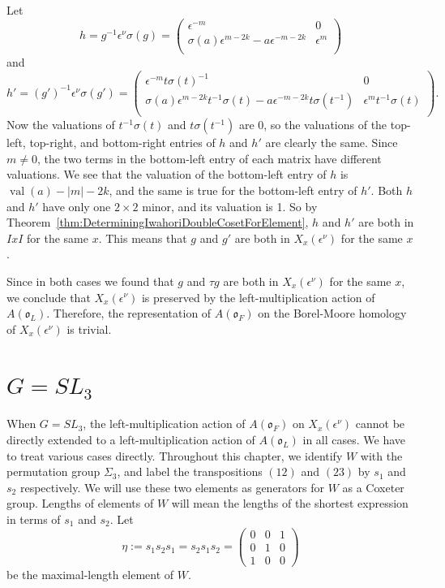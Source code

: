 \documentclass{amsart}
\theoremstyle{definition}
\def\O{\mathfrak{o}}
\def\e{\epsilon}
\def\val{\mathop{\mathrm{val}}}
\def\s{\sigma}
\def\A{A(\O_F)}
\def\en{\e^{\nu}}
\def\X{X_x(\en)}
\newenvironment{caselist}
	       {\begin{list}{\underline{Case \arabic{enumi}}:}
		   {\usecounter{enumi}
		     \setlength{\itemindent}{0.5in}
		     \setlength{\leftmargin}{0in}
		     \setlength{\rightmargin}{0in}
	       }}
	       {\end{list}}
\begin{document}
\begin{caselist}
      Let
      \begin{equation*}
	h = g^{-1}\en \s(g) =
	\begin{pmatrix}
	  \e^{-m} & 0 \\
	  \s(a)\e^{m-2k} - a \e^{-m-2k} & \e^{m} \\
      	\end{pmatrix}
      \end{equation*}
      and 
      \begin{equation*}
	h' = (g')^{-1}\en \s(g') = 
	\begin{pmatrix}
	  \e^{-m} t\s(t)^{-1} & 0 \\
	  \s(a)\e^{m-2k}t^{-1}\s(t) - a \e^{-m-2k} t\s(t^{-1}) & \e^{m}t^{-1}\s(t)\\
	\end{pmatrix}.
      \end{equation*}
      Now the valuations of $t^{-1}\s(t)$ and $t\s(t^{-1})$ are 0, so the
      valuations of the top-left, top-right, and bottom-right entries of $h$
      and $h'$ are clearly the same.  Since $m \neq 0$, the two terms in the
      bottom-left entry of each matrix have different valuations.  We see that
      the valuation of the bottom-left entry of $h$ is $\val(a) - |m| - 2k$,
      and the same is true for the bottom-left entry of $h'$.  Both $h$ and
      $h'$ have only one $2 \times 2$ minor, and its valuation is 1.  So by
      Theorem~\ref{thm:DeterminingIwahoriDoubleCosetForElement}, $h$ and $h'$
      are both in $IxI$ for the same $x$.  This means that $g$ and $g'$ are
      both in $\X$ for the same $x$.
  \end{caselist}
  Since in both cases we found that $g$ and $\tau g$ are both in $\X$ for the
  same $x$, we conclude that $\X$ is preserved by the left-multiplication
  action of $A(\O_L)$.  Therefore, the representation of $\A$ on the
  Borel-Moore homology of $\X$ is trivial.
  
  \section{$G = SL_3$}
  \label{chap:SL_3}
  When $G = SL_3$, the left-multiplication action of $\A$ on $\X$ cannot be
  directly extended to a left-multiplication action of $A(\O_L)$ in all cases.
  We have to treat various cases directly.  Throughout this chapter, we
  identify $W$ with the permutation group $\Sigma_3$, and label the
  transpositions $(12)$ and $(23)$ by $s_1$ and $s_2$ respectively.  We will
  use these two elements as generators for $W$ as a Coxeter group.  Lengths of
  elements of $W$ will mean the lengths of the shortest expression in terms of
  $s_1$ and $s_2$.  Let  
  \begin{equation*}
    \eta := s_1 s_2 s_1 = s_2 s_1 s_2 = \begin{pmatrix}
      0 & 0 & 1 \\
      0 & 1 & 0 \\
      1 & 0 & 0
    \end{pmatrix}
  \end{equation*}
  be the maximal-length element of $W$.
\end{document}
